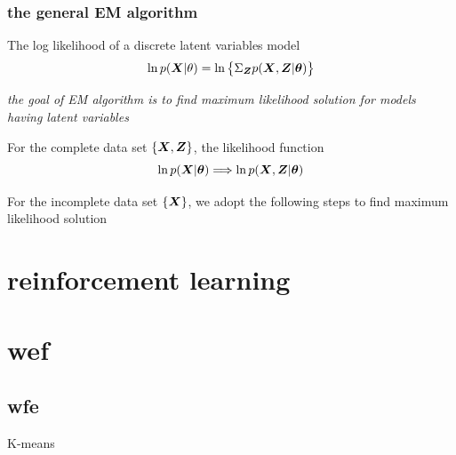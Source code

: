 \documentclass[11pt]{article}
\begin{document}
\subsubsection{the general EM algorithm}
\label{sec:orgb4c5ed5}
The log likelihood of a discrete latent variables model
\begin{equation*}
\ln p(\boldsymbol{X}|\theta)=\ln\left\{\displaystyle\Sigma_{\boldsymbol{Z}} p(\boldsymbol{X},\boldsymbol{Z}|\boldsymbol{\theta})\right\}
\end{equation*}


\emph{the goal of EM algorithm is to find maximum likelihood solution for models
having latent variables} 


For the complete data set \(\left\{\boldsymbol{X},\boldsymbol{Z}\right\}\), the likelihood function
\begin{equation*}
\ln p(\boldsymbol{X}|\boldsymbol{\theta})\Longrightarrow \ln p(\boldsymbol{X},\boldsymbol{Z}|\boldsymbol{\theta})
\end{equation*}


For the incomplete data set \(\left\{\boldsymbol{X}\right\}\), we adopt the following steps to
find maximum likelihood solution
\section{reinforcement learning}
\label{sec:org82fcd40}

\section{wef}
\label{sec:orgae94296}
\subsection{wfe}
\label{sec:org9756ee4}
K-means
\end{document}
